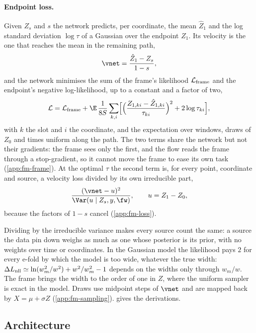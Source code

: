 \paragraph{Endpoint loss.}
Given $Z_s$ and $s$ the network predicts, per coordinate, the mean $\hat Z_1$ and the log standard
deviation $\log\tau$ of a Gaussian over the endpoint $Z_1$. Its velocity is the one that reaches
the mean in the remaining path,
\begin{equation}
  \vnet = \frac{\hat Z_1 - Z_s}{1-s},
  \label{eq:fm-velocity}
\end{equation}
and the network minimises the sum of the frame's likelihood $\mathcal L_{\rm frame}$ and the
endpoint's negative log-likelihood, up to a constant and a factor of two,
\begin{equation}
  \mathcal L = \mathcal L_{\rm frame} + \E\,\frac{1}{8S}\sum_{k,i}
  \Bigl[\Bigl(\frac{Z_{1,ki}-\hat Z_{1,ki}}{\tau_{ki}}\Bigr)^2 + 2\log\tau_{ki}\Bigr],
  \label{eq:loss}
\end{equation}
with $k$ the slot and $i$ the coordinate, and the expectation over windows, draws of $Z_0$ and times uniform along the path. The two terms
share the network but not their gradients: the frame sees only the first, and the flow reads the
frame through a stop-gradient, so it cannot move the frame to ease its own task
(\cref{app:fm-frame}). At the optimal $\tau$ the second term is, for every point, coordinate and
source, a velocity loss divided by its own irreducible part,
\begin{equation}
  \frac{(\vnet - u)^2}{\Var(u\mid Z_s,y,\fw)},\qquad u = Z_1 - Z_0 ,
  \label{eq:fm-relative}
\end{equation}
because the factors of $1-s$ cancel (\cref{app:fm-loss}).

Dividing by the irreducible variance makes every source count the same: a source the data pin down
weighs as much as one whose posterior is its prior, with no weights over time or coordinates. In the
Gaussian model the likelihood pays $2$ for every e-fold by which the model is too wide, whatever
the true width: $\Delta L_{\rm nll}\simeq\ln(w_m^2/w^2)+w^2/w_m^2-1$ depends on the widths only
through $w_m/w$. The frame brings the width to the order of one in $Z$, where the uniform sampler
is exact in the model. Draws use \FlowMatchingOdeSteps{} midpoint steps of $\vnet$ and are mapped
back by $X=\mu+\sigma Z$ (\cref{app:fm-sampling}).  gives the derivations.

\subsection{Architecture}
\label{sec:method-network}\label{sec:gw-tokens}

